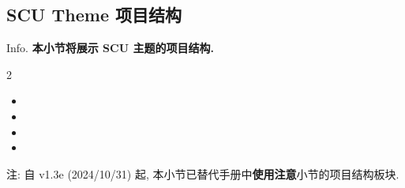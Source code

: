 \subsection{SCU Theme 项目结构}
\begin{frame}{Info.}
	\textbf{本小节将展示 SCU 主题的项目结构.}
	\begin{multicols}{2}
		\begin{itemize}
			\item {}
			\item {}
			\item {}
			\item {}
		\end{itemize}
	\end{multicols}
	注: 自 \textcolor{scugreen}{v1.3e (2024/10/31)} 起, 本小节已替代手册中\alert{\textbf{使用注意}}小节的\alert{项目结构}板块.\par
	\mycopyright
\end{frame}


